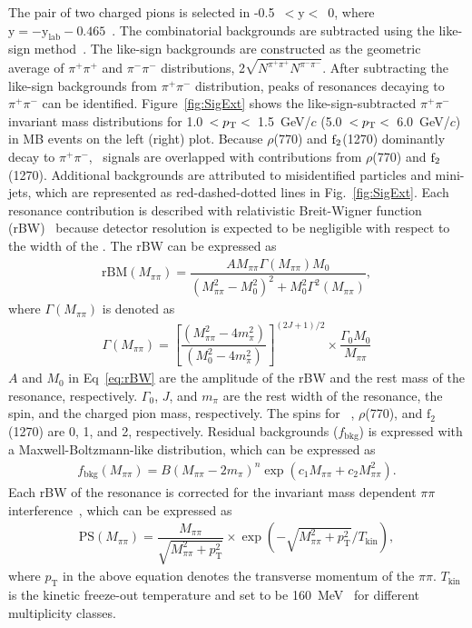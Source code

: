 The pair of two charged pions is selected in -0.5~$<\mathrm{y}<$~0, where $\mathrm{y} = -\mathrm{y}_{\mathrm{lab}} -0.465$~\cite{ALICE:2017pgw}. The combinatorial backgrounds are subtracted using the like-sign method~\cite{PhysRevD.36.2019}. The like-sign backgrounds are constructed as the geometric average of $\pi^{+}\pi^{+}$ and $\pi^{-}\pi^{-}$ distributions,  2$\sqrt{N^{\pi^{+}\pi^{+}}N^{\pi^{-}\pi^{-}}}$. After subtracting the like-sign backgrounds from $\pi^{+}\pi^{-}$ distribution, peaks of resonances decaying to $\pi^{+}\pi^{-}$ can be identified. Figure~\ref{fig:SigExt} shows the like-sign-subtracted $\pi^{+}\pi^{-}$ invariant mass distributions for 1.0~$<p_{\rm{T}}<$~1.5~GeV/$c$ (5.0~$<p_{\rm{T}}<$~6.0~GeV/$c$) in MB events on the left (right) plot. Because $\rho$(770) and $\rm{f}_{2}$(1270) dominantly decay to $\pi^{+}\pi^{-}$, \fzero~signals are overlapped with contributions from $\rho$(770) and $\rm{f}_{2}$(1270). Additional backgrounds are attributed to misidentified particles and mini-jets, which are represented as red-dashed-dotted lines in Fig.~\ref{fig:SigExt}. Each resonance contribution is described with relativistic Breit-Wigner function (rBW)~\cite{ALICE:2018qdv, ALICE:2022qnb} because detector resolution is expected to be negligible with respect to the width of the \fzero. The rBW can be expressed as
\begin{eqnarray}
\mathrm{rBM}(M_{\pi\pi}) = \dfrac{AM_{\pi\pi}\Gamma(M_{\pi\pi})M_{0}}{(M_{\pi\pi}^{2}-M_{0}^{2})^{2} + M_{0}^{2}\Gamma^{2}(M_{\pi\pi})},
\label{eq:rBW}
\end{eqnarray}
where $\Gamma(M_{\pi\pi})$ is denoted as
\begin{eqnarray}
\Gamma(M_{\pi\pi}) = \left[ \dfrac{ (M_{\pi\pi}^{2} - 4m_{\pi}^{2}) }{ (M_{0}^{2}-4m_{\pi}^{2}) } \right]^{(2J+1)/2} \times \dfrac{\Gamma_{0}M_{0}}{M_{\pi\pi}}
\label{eq:rBWW}
\end{eqnarray}
$A$ and $M_{0}$ in Eq~\ref{eq:rBW} are the amplitude of the rBW and the rest mass of the resonance, respectively. $\Gamma_{0}$, $J$, and $m_{\pi}$ are the rest width of the resonance, the spin, and the charged pion mass, respectively. The spins for \fzero~, $\rho$(770), and $\mathrm{f}_{2}$(1270) are 0, 1, and 2, respectively. Residual backgrounds ($f_{\mathrm{bkg}}$) is expressed with a Maxwell-Boltzmann-like distribution, which can be expressed as~\cite{OPAL:1998enc}
\begin{eqnarray}
f_{\mathrm{bkg}}(M_{\pi\pi}) = B(M_{\pi\pi}-2m_{\pi})^{n}\exp{(c_{1}M_{\pi\pi} + c_{2}M_{\pi\pi}^{2})}.
\label{eq:bkg}
\end{eqnarray} 
Each rBW of the resonance is corrected for the invariant mass dependent $\pi\pi$ interference~\cite{Rapp:2003ar}, which can be expressed as
\begin{eqnarray}
\mathrm{PS}(M_{\pi\pi}) = \dfrac{M_{\pi\pi}}{\sqrt{M_{\pi\pi}^{2}+p_{\mathrm{T}}^{2}}}\times\exp{(-\sqrt{M_{\pi\pi}^{2}+p_{\mathrm{T}}^{2}}/T_{\mathrm{kin}})},
\label{eq:ps}
\end{eqnarray} 
where $p_{\mathrm{T}}$ in the above equation denotes the transverse momentum of the $\pi\pi$. $T_{\mathrm{kin}}$ is the kinetic freeze-out temperature and set to be 160~MeV~\cite{ALICE:2013wgn} for different multiplicity classes.

